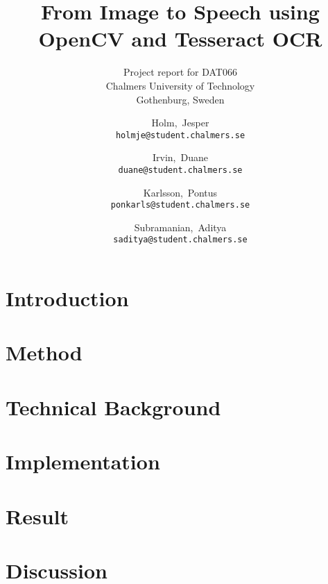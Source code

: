 \documentclass[a4paper, english, abstract=on]{scrartcl}
\begin{document}
\title{From Image to Speech using \\ OpenCV and Tesseract OCR}
\subtitle{Project report for DAT066 \\
  Chalmers University of Technology \\
  Gothenburg, Sweden
}
\author{
  Holm,~Jesper \\ \texttt{holmje@student.chalmers.se}
  \and Irvin,~Duane \\ \texttt{duane@student.chalmers.se}
  \and Karlsson,~Pontus \\ \texttt{ponkarls@student.chalmers.se}
  \and Subramanian,~Aditya \\ \texttt{saditya@student.chalmers.se}
}
\clearpage\maketitle
\thispagestyle{empty}
\pagebreak


\thispagestyle{empty}
\pagebreak

\hypersetup{linkcolor=black}
\tableofcontents
\thispagestyle{empty}
\pagebreak

\setcounter{page}{1}

\section{Introduction}


\section{Method}


\section{Technical Background}


\section{Implementation}


\section{Result}


\section{Discussion}


\pagebreak


\end{document}
